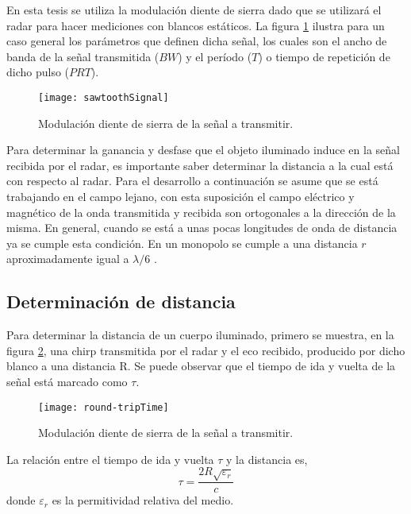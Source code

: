 En esta tesis se utiliza la modulación diente de sierra dado que se utilizará el radar para hacer mediciones con blancos estáticos. La figura \ref{fig:sawtoothSignal} ilustra para un caso general los parámetros que definen dicha señal, los cuales son el ancho de banda de la señal transmitida ($BW$) y el período ($T$) o tiempo de repetición de dicho pulso ($PRT$).

\begin{figure}
 \centering
 \texttt{[image: sawtoothSignal]}
 \caption{Modulación diente de sierra de la señal a transmitir.}
 \label{fig:sawtoothSignal}
\end{figure}

Para determinar la ganancia y desfase que el objeto iluminado induce en la señal recibida por el radar, es importante saber determinar la distancia a la cual está con respecto al radar. Para el desarrollo a continuación se asume que se está trabajando en el campo lejano, con esta suposición el campo eléctrico y magnético de la onda transmitida y recibida son ortogonales a la dirección de la misma. En general, cuando se está a unas pocas longitudes de onda de distancia ya se cumple esta condición. En un monopolo se cumple a una distancia $r$ aproximadamente igual a $\lambda/ 6$ \cite{Richards2009}.

\subsection{Determinación de distancia}

Para determinar la distancia de un cuerpo iluminado, primero se muestra, en la figura \ref{fig:roundTripTime}, una chirp transmitida por el radar y el eco recibido, producido por dicho blanco a una distancia R. Se puede observar que el tiempo de ida y vuelta de la señal está marcado como $\tau$.

\begin{figure}
 \centering
 \texttt{[image: round-tripTime]}
 \caption{Modulación diente de sierra de la señal a transmitir.}
 \label{fig:roundTripTime}
\end{figure}

La relación entre el tiempo de ida y vuelta $\tau$ y la distancia es,
\begin{equation}\label{eq:relDist}
  \tau = \dfrac{2R\sqrt{\varepsilon_r}}{c}
\end{equation}
donde $\varepsilon_r$ es la permitividad relativa del medio.

